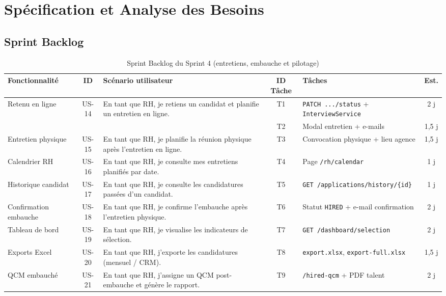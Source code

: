 \section{Spécification et Analyse des Besoins}

\subsection{Sprint Backlog}

\begin{table}[htbp]
  \centering
  \scriptsize
  \caption{Sprint Backlog du Sprint 4 (entretiens, embauche et pilotage)}
  \label{tab:sprint4-backlog}
  \begin{tabular}{|p{2.0cm}|c|p{4.0cm}|c|p{3.1cm}|c|}
    \hline
    \textbf{Fonctionnalité} & \textbf{ID} & \textbf{Scénario utilisateur} &
    \textbf{ID Tâche} & \textbf{Tâches} & \textbf{Est.} \\
    \hline
    Retenu en ligne
    & US-14
    & En tant que RH, je retiens un candidat et planifie un entretien en ligne.
    & T1
    & \texttt{PATCH .../status} + \texttt{InterviewService}
    & 2 j \\
    \cline{4-6}
    & & & T2 & Modal entretien + e-mails & 1,5 j \\
    \hline
    Entretien physique
    & US-15
    & En tant que RH, je planifie la réunion physique après l'entretien en ligne.
    & T3
    & Convocation physique + lieu agence
    & 1,5 j \\
    \hline
    Calendrier RH
    & US-16
    & En tant que RH, je consulte mes entretiens planifiés par date.
    & T4
    & Page \texttt{/rh/calendar}
    & 1 j \\
    \hline
    Historique candidat
    & US-17
    & En tant que RH, je consulte les candidatures passées d'un candidat.
    & T5
    & \texttt{GET /applications/history/\{id\}}
    & 1 j \\
    \hline
    Confirmation embauche
    & US-18
    & En tant que RH, je confirme l'embauche après l'entretien physique.
    & T6
    & Statut \texttt{HIRED} + e-mail confirmation
    & 2 j \\
    \hline
    Tableau de bord
    & US-19
    & En tant que RH, je visualise les indicateurs de sélection.
    & T7
    & \texttt{GET /dashboard/selection}
    & 2 j \\
    \hline
    Exports Excel
    & US-20
    & En tant que RH, j'exporte les candidatures (mensuel / CRM).
    & T8
    & \texttt{export.xlsx}, \texttt{export-full.xlsx}
    & 1,5 j \\
    \hline
    QCM embauché
    & US-21
    & En tant que RH, j'assigne un QCM post-embauche et génère le rapport.
    & T9
    & \texttt{/hired-qcm} + PDF talent
    & 2 j \\
    \hline
  \end{tabular}
\end{table}


